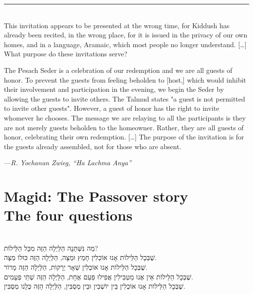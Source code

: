 \documentclass[a4paper,10pt,openany]{memoir}
\newcommand{\HgInst}[1]{{\noindent\sffamily{\bfseries{#1}}}}
\newcommand{\HgSource}[1]{\hfill{\small---\itshape{#1}}}
\newcommand{\HgFill}{\vfill \hrule \vfill}
\newenvironment{HgEnglish}{\strut\\\noindent}{\vspace{1em}}
\newenvironment{HgHebrew}{\begin{hebrew}\strut\\\noindent\Large}{\end{hebrew}}
\begin{document}
\HgFill

\begin{HgEnglish}
This invitation appears to be presented at the wrong time, for Kiddush has
already been recited, in the wrong place, for it is issued in the privacy of our
own homes, and in a language, Aramaic, which most people no longer understand.
[\ldots] What purpose do these invitations serve?

The Pesach Seder is a celebration of our redemption and we are all guests of
honor. To prevent the guests from feeling beholden to [host,] which would
inhibit their involvement and participation in the evening, we begin the Seder
by allowing the guests to invite others. The Talmud states "a guest is not
permitted to invite other guests". However, a guest of honor has the right to
invite whomever he chooses. The message we are relaying to all the participants
is they are not merely guests beholden to the homeowner. Rather, they are all
guests of honor, celebrating their own redemption. [\ldots] The purpose of the
invitation is for the guests already assembled, not for those who are absent.

\HgSource{R. Yochanan Zwieg, ``Ha Lachma Anya''}
\end{HgEnglish}

\chapter*{Magid: The Passover story \\ {\LARGE The four questions}}

\vfill

\HgInst{The youngest person present recites:}

\begin{HgHebrew}
מַה נִּשְּׁתַּנָה הַלַּיְלָה הַזֶּה מִכָּל הַלֵּילוֹת? 
\\
שֶׁבְּכָל הַלֵּילוֹת אָנוּ אוֹכְלִין חָמֵץ וּמַצָּה,
הַלַּיְלָה הַזֶּה כּוּלוֹ מַצָּה. 
\\
שֶׁבְּכָל הַלֵּילוֹת אָנוּ אוֹכְלִין שְׁאָר יְרָקוֹת,
הַלַּיְלָה הַזֶּה מָרוֹר. 
\\
שֶׁבְּכָל הַלֵּילוֹת אֵין אֶנוּ מַטְבִּילִין אֲפִילוּ פַּעַם אֶחָת, 
הַלַּיְלָה הַזֶּה שְׁתֵּי פְעָמִים. 
\\
שֶׁבְּכָל הַלֵּילוֹת אָנוּ אוֹכְלִין בֵּין יוֹשְׁבִין וּבֵין מְסֻבִּין, 
הַלַּיְלָה הַזֶּה כֻּלָנו מְסֻבִּין. 
\end{HgHebrew}
\end{document}
